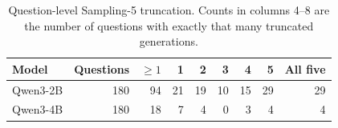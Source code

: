 \begin{table}[htbp]
\centering
\caption{Question-level Sampling-5 truncation. Counts in columns 4--8 are the number of questions with exactly that many truncated generations.}
\label{tab:appendix-sampling-question-truncation}
\small
\begin{tabular}{lrrrrrrrr}
\toprule
Model & Questions & $\geq 1$ & 1 & 2 & 3 & 4 & 5 & All five \\
\midrule
Qwen3-2B & 180 & 94 & 21 & 19 & 10 & 15 & 29 & 29 \\
Qwen3-4B & 180 & 18 & 7 & 4 & 0 & 3 & 4 & 4 \\
\bottomrule
\end{tabular}
\end{table}
